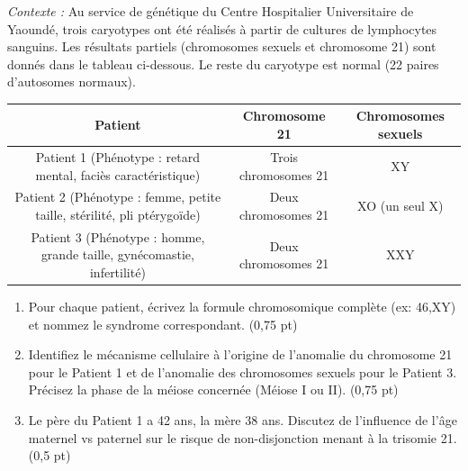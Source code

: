 \documentclass[11pt]{article}
\begin{document}
\begin{exercice}
\emph{Contexte :} Au service de génétique du Centre Hospitalier Universitaire de Yaoundé, trois caryotypes ont été réalisés à partir de cultures de lymphocytes sanguins. Les résultats partiels (chromosomes sexuels et chromosome 21) sont donnés dans le tableau ci-dessous. Le reste du caryotype est normal (22 paires d'autosomes normaux).

\begin{center}
\begin{tabular}{|c|c|c|}
\hline
\textbf{Patient} & \textbf{Chromosome 21} & \textbf{Chromosomes sexuels} \\ \hline
Patient 1 (Phénotype : retard mental, faciès caractéristique) & Trois chromosomes 21 & XY \\ \hline
Patient 2 (Phénotype : femme, petite taille, stérilité, pli ptérygoïde) & Deux chromosomes 21 & XO (un seul X) \\ \hline
Patient 3 (Phénotype : homme, grande taille, gynécomastie, infertilité) & Deux chromosomes 21 & XXY \\ \hline
\end{tabular}
\end{center}
\begin{enumerate}
\item Pour chaque patient, écrivez la formule chromosomique complète (ex: 46,XY) et nommez le syndrome correspondant. \hfill (0,75 pt)
\item Identifiez le mécanisme cellulaire à l'origine de l'anomalie du chromosome 21 pour le Patient 1 et de l'anomalie des chromosomes sexuels pour le Patient 3. Précisez la phase de la méiose concernée (Méiose I ou II). \hfill (0,75 pt)
\item Le père du Patient 1 a 42 ans, la mère 38 ans. Discutez de l'influence de l'âge maternel vs paternel sur le risque de non-disjonction menant à la trisomie 21. \hfill (0,5 pt)
\end{enumerate}
\end{exercice}
\end{document}
